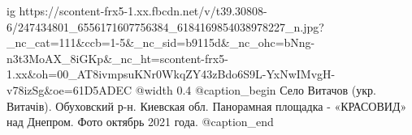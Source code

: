  
 
 
 
 

\ifcmt
  ig https://scontent-frx5-1.xx.fbcdn.net/v/t39.30808-6/247434801_6556171607756384_6184169854038978227_n.jpg?_nc_cat=111&ccb=1-5&_nc_sid=b9115d&_nc_ohc=bNng-n3t3MoAX_8iGKp&_nc_ht=scontent-frx5-1.xx&oh=00_AT8ivmpsuKNr0WkqZY43zBdo6S9L-YxNwIMvgH-v78izSg&oe=61D5ADEC
  @width 0.4
  @caption_begin
    Село Витачов (укр. Витачів). Обуховский р-н. Киевская обл. 
    Панорамная площадка - «КРАСОВИД» над Днепром. Фото октябрь 2021 года.
  @caption_end
\fi
